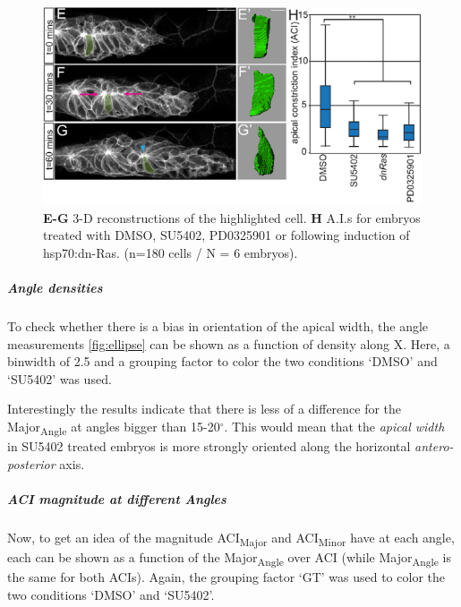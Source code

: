 \documentclass[11pt,singlespacinge,twoside]{reedthesis} %
\begin{document}
\begin{figure}

{\centering \includegraphics[width=0.6\linewidth]{figure/02-MaMo/GrTr/HardingACI} 

}

\caption[Published ACI]{\textbf{E-G} 3-D reconstructions of the highlighted cell. \textbf{H} A.I.s for embryos treated with DMSO, SU5402, PD0325901 or following induction of hsp70:dn-Ras. (n=180 cells / N = 6 embryos).}\label{fig:HardingACI}
\end{figure}
\hypertarget{ACI-Angledens}{%
\subparagraph{Angle densities}\label{ACI-Angledens}}

To check whether there is a bias in orientation of the apical width, the angle measurements \ref{fig:ellipse} can be shown as a function of density along X. Here, a binwidth of 2.5 and a grouping factor to color the two conditions `DMSO' and `SU5402' was used.

\noindent Interestingly the results indicate that there is less of a difference for the Major\textsubscript{Angle} at angles bigger than 15-20\(^\circ\). This would mean that the \emph{apical width} in SU5402 treated embryos is more strongly oriented along the horizontal \emph{antero-posterior} axis.

\hypertarget{ACI-mag}{%
\subparagraph{ACI magnitude at different Angles}\label{ACI-mag}}

Now, to get an idea of the magnitude ACI\textsubscript{Major} and ACI\textsubscript{Minor} have at each angle, each can be shown as a function of the Major\textsubscript{Angle} over ACI (while Major\textsubscript{Angle} is the same for both ACIs). Again, the grouping factor `GT' was used to color the two conditions `DMSO' and `SU5402'.
\end{document}
